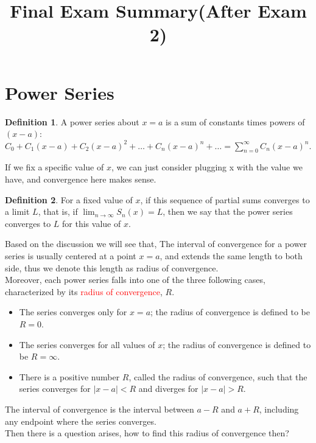 \documentclass[12pt]{article}
\date{}
\title{Final Exam Summary(After Exam 2)}
\theoremstyle{definition}
\theoremstyle{definition}
\newtheorem{definition}{Definition}[section]
\theoremstyle{remark}
\theoremstyle{definition}
\theoremstyle{definition}
\theoremstyle{definition}
\begin{document}
\maketitle

\section{Power Series}
\begin{definition}
	A power series about $x = a$ is a sum of constants times powers of $(x - a)$: 
	$C_0 + C_1(x - a) + C_2(x - a)^2 + \ldots + C_n(x - a)^n + \ldots =	\sum_{n
	=0}^{\infty}	C_n(x - a)^n$.
\end{definition}

If we fix a specific value of $x$, we can just consider plugging x with the value we have, and convergence here makes sense.

\begin{definition}
For a fixed value of $x$, if this sequence of partial sums converges to a limit $L$, that is, if
$\lim_{n \to \infty}S_n(x) = L$, then we say that the power series converges to $L$ for this value of $x$.
\end{definition}

Based on the discussion we will see that, The interval of convergence for a power series is usually centered at a point $x=a$, and extends the same length to both side, thus we denote this length as radius of convergence.\\

Moreover, each power series falls into one of the three following cases, characterized by its \textcolor{red}{radius of convergence}, $R$.
\begin{itemize}
\item The series converges only for $x = a$; the radius of convergence is defined to be $R = 0$.
\item The series converges for all values of $x$; the radius of convergence is defined to be
$R = \infty$.
\item There is a positive number $R$, called the radius of convergence, such that the series
converges for $|x - a| < R$ and diverges for $|x - a| > R$. 
\end{itemize}
The interval of convergence is the interval between $a - R$ and $a + R$, including any
endpoint where the series converges.
\\

Then there is a question arises, how to find this radius of convergence then?\\
\end{document}
